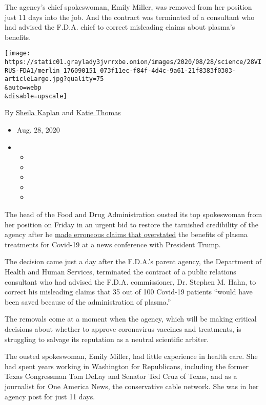 The agency's chief spokeswoman, Emily Miller, was removed from her
position just 11 days into the job. And the contract was terminated of a
consultant who had advised the F.D.A. chief to correct misleading claims
about plasma's benefits.

\texttt{[image: https://static01.graylady3jvrrxbe.onion/images/2020/08/28/science/28VIRUS-FDA1/merlin\_176090151\_073f11ec-f84f-4d4c-9a61-21f8383f0303-articleLarge.jpg?quality=75\\\&auto=webp\\\&disable=upscale]}

By \href{https://www.nytimes3xbfgragh.onion/by/sheila-kaplan}{Sheila
Kaplan} and
\href{https://www.nytimes3xbfgragh.onion/by/katie-thomas}{Katie Thomas}

\begin{itemize}
\item
  Aug. 28, 2020
\item
  \begin{itemize}
  \item
  \item
  \item
  \item
  \item
  \end{itemize}
\end{itemize}

The head of the Food and Drug Administration ousted its top spokeswoman
from her position on Friday in an urgent bid to restore the tarnished
credibility of the agency after he
\href{https://www.nytimes3xbfgragh.onion/2020/08/24/health/fda-blood-plasma.html}{made
erroneous claims that overstated} the benefits of plasma treatments for
Covid-19 at a news conference with President Trump.

The decision came just a day after the F.D.A.'s parent agency, the
Department of Health and Human Services, terminated the contract of a
public relations consultant who had advised the F.D.A. commissioner, Dr.
Stephen M. Hahn, to correct his misleading claims that 35 out of 100
Covid-19 patients ``would have been saved because of the administration
of plasma.''

The removals come at a moment when the agency, which will be making
critical decisions about whether to approve coronavirus vaccines and
treatments, is struggling to salvage its reputation as a neutral
scientific arbiter.

The ousted spokeswoman, Emily Miller, had little experience in health
care. She had spent years working in Washington for Republicans,
including the former Texas Congressman Tom DeLay and Senator Ted Cruz of
Texas, and as a journalist for One America News, the conservative cable
network. She was in her agency post for just 11 days.

